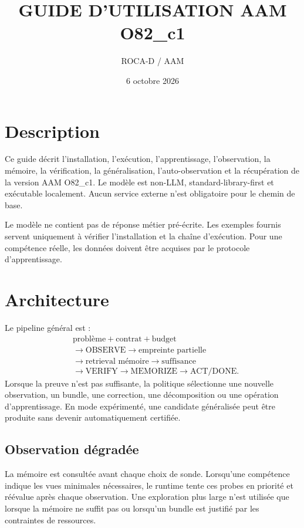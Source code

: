 \documentclass[11pt,a4paper]{report}
\title{GUIDE D'UTILISATION AAM O82\_c1}
\author{ROCA-D / AAM}
\date{6 octobre 2026}
\begin{document}
\setlength{\emergencystretch}{2em}
\maketitle
\tableofcontents

\chapter{Description}
Ce guide décrit l'installation, l'exécution, l'apprentissage, l'observation, la mémoire, la vérification, la généralisation, l'auto-observation et la récupération de la version AAM O82\_c1. Le modèle est non-LLM, standard-library-first et exécutable localement. Aucun service externe n'est obligatoire pour le chemin de base.

Le modèle ne contient pas de réponse métier pré-écrite. Les exemples fournis servent uniquement à vérifier l'installation et la chaîne d'exécution. Pour une compétence réelle, les données doivent être acquises par le protocole d'apprentissage.

\chapter{Architecture}
Le pipeline général est :
\begin{align*}
&\text{problème}+\text{contrat}+\text{budget}\\
&\rightarrow\text{OBSERVE}\rightarrow\text{empreinte partielle}\\
&\rightarrow\text{retrieval mémoire}\rightarrow\text{suffisance}\\
&\rightarrow\text{VERIFY}\rightarrow\text{MEMORIZE}\rightarrow\text{ACT/DONE}.
\end{align*}
Lorsque la preuve n'est pas suffisante, la politique sélectionne une nouvelle observation, un bundle, une correction, une décomposition ou une opération d'apprentissage. En mode expérimenté, une candidate généralisée peut être produite sans devenir automatiquement certifiée.

\section{Observation dégradée}
La mémoire est consultée avant chaque choix de sonde. Lorsqu'une compétence indique les vues minimales nécessaires, le runtime tente ces probes en priorité et réévalue après chaque observation. Une exploration plus large n'est utilisée que lorsque la mémoire ne suffit pas ou lorsqu'un bundle est justifié par les contraintes de ressources.
\end{document}
